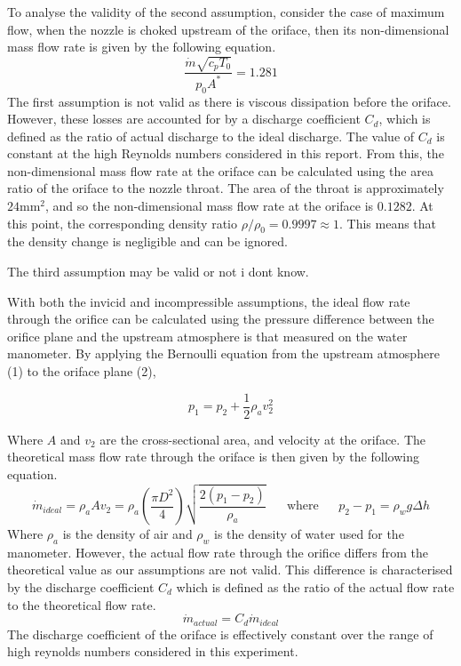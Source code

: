 \documentclass[8pt]{article}
\begin{document}
To analyse the validity of the second assumption, consider the case of maximum flow, when the nozzle is choked upstream of the oriface, then its non-dimensional mass flow rate is given by the following equation.
\begin{equation}
    \frac{\dot{m}\sqrt{c_pT_0}}{p_0A^*} = 1.281
\end{equation}
The first assumption is not valid as there is viscous dissipation before the oriface. However, these losses are accounted for by a discharge coefficient $C_d$, which is defined as the ratio of actual discharge to the ideal discharge.
The value of $C_d$ is constant at the high Reynolds numbers considered in this report.
From this, the non-dimensional mass flow rate at the oriface can be calculated using the area ratio of the oriface to the nozzle throat.
The area of the throat is approximately $24\text{mm}^2$, and so the non-dimensional mass flow rate at the oriface is $0.1282$.
At this point, the corresponding density ratio $\rho/\rho_0 = 0.9997 \approx 1$. This means that the density change is negligible and can be ignored.

The third assumption may be valid or not i dont know.

With both the invicid and incompressible assumptions, the ideal flow rate through the orifice can be calculated using the pressure difference between the orifice plane and the upstream atmosphere is that measured on the
water manometer. By applying the Bernoulli equation from the upstream atmosphere (1) to the oriface plane (2),

\begin{equation}
    p_1 = p_2 + \frac{1}{2} \rho_a v_2^2
\end{equation}

Where $A$ and $v_2$ are the cross-sectional area, and velocity at the oriface. The theoretical mass flow rate through the oriface is then given by the following equation.
\begin{equation}
    \dot{m}_{ideal} = \rho_a A v_2 = \rho_a \left( \frac{\pi D^2}{4}\right) \sqrt{\frac{2(p_1-p_2)}{\rho_a}} \;\;\;\;\;\; \text{where} \;\;\;\;\;\ p_2 - p_1 = \rho_w g \Delta h
\end{equation}
Where $\rho_a$ is the density of air and $\rho_w$ is the density of water used for the manometer.
However, the actual flow rate through the orifice differs from the theoretical value as our assumptions are not valid.
This difference is characterised by the discharge coefficient $C_d$ which is defined as the ratio of the actual flow rate to the theoretical flow rate.
\begin{equation}
    \dot{m}_{actual} = C_d \dot{m}_{ideal}
\end{equation}
The discharge coefficient of the oriface is effectively constant over the range of high reynolds numbers considered in this experiment. 
\end{document}
